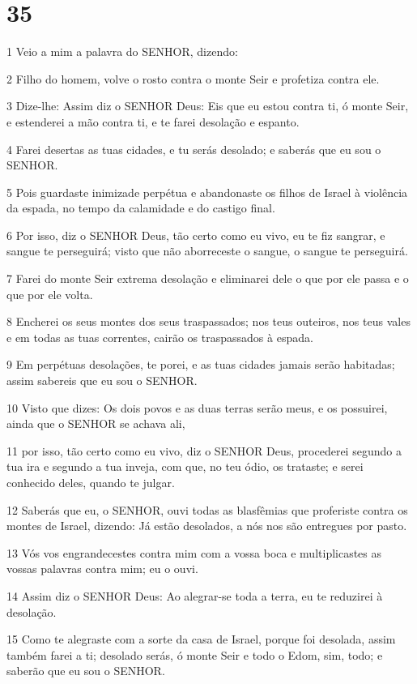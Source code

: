 \chapter{35}

\par 1 Veio a mim a palavra do SENHOR, dizendo:
\par 2 Filho do homem, volve o rosto contra o monte Seir e profetiza contra ele.
\par 3 Dize-lhe: Assim diz o SENHOR Deus: Eis que eu estou contra ti, ó monte Seir, e estenderei a mão contra ti, e te farei desolação e espanto.
\par 4 Farei desertas as tuas cidades, e tu serás desolado; e saberás que eu sou o SENHOR.
\par 5 Pois guardaste inimizade perpétua e abandonaste os filhos de Israel à violência da espada, no tempo da calamidade e do castigo final.
\par 6 Por isso, diz o SENHOR Deus, tão certo como eu vivo, eu te fiz sangrar, e sangue te perseguirá; visto que não aborreceste o sangue, o sangue te perseguirá.
\par 7 Farei do monte Seir extrema desolação e eliminarei dele o que por ele passa e o que por ele volta.
\par 8 Encherei os seus montes dos seus traspassados; nos teus outeiros, nos teus vales e em todas as tuas correntes, cairão os traspassados à espada.
\par 9 Em perpétuas desolações, te porei, e as tuas cidades jamais serão habitadas; assim sabereis que eu sou o SENHOR.
\par 10 Visto que dizes: Os dois povos e as duas terras serão meus, e os possuirei, ainda que o SENHOR se achava ali,
\par 11 por isso, tão certo como eu vivo, diz o SENHOR Deus, procederei segundo a tua ira e segundo a tua inveja, com que, no teu ódio, os trataste; e serei conhecido deles, quando te julgar.
\par 12 Saberás que eu, o SENHOR, ouvi todas as blasfêmias que proferiste contra os montes de Israel, dizendo: Já estão desolados, a nós nos são entregues por pasto.
\par 13 Vós vos engrandecestes contra mim com a vossa boca e multiplicastes as vossas palavras contra mim; eu o ouvi.
\par 14 Assim diz o SENHOR Deus: Ao alegrar-se toda a terra, eu te reduzirei à desolação.
\par 15 Como te alegraste com a sorte da casa de Israel, porque foi desolada, assim também farei a ti; desolado serás, ó monte Seir e todo o Edom, sim, todo; e saberão que eu sou o SENHOR.

